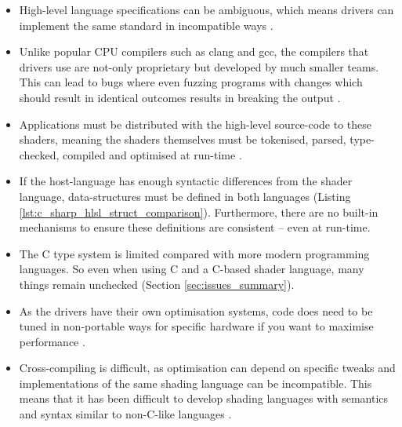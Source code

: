 \documentclass[a4paper,12pt,twoside,openright]{report}
\begin{document}
\begin{itemize}

    \item High-level language specifications can be ambiguous, which means
    drivers can implement the same standard in incompatible ways \cite{TODO}.

    \item Unlike popular CPU compilers such as clang and gcc, the compilers
    that drivers use are not-only proprietary but developed by much smaller
    teams. This can lead to bugs where even fuzzing programs with changes which
    should result in identical outcomes results in breaking the output
    \cite{GLFuzz}. %

    \item Applications must be distributed with the high-level source-code to
    these shaders, meaning the shaders themselves must be tokenised, parsed,
    type-checked, compiled and optimised at run-time \cite{TODO}.

    \item If the host-language has enough syntactic differences from the shader
    language, data-structures must be defined in both languages (Listing
    \ref{lst:c_sharp_hlsl_struct_comparison}). Furthermore, there are no
    built-in mechanisms to ensure these definitions are consistent -- even at
    run-time.

    \item The C type system is limited compared with more modern programming
    languages. So even when using C and a C-based shader language, many things
    remain unchecked (Section \ref{sec:issues_summary}).

    \item As the drivers have their own optimisation systems, code does need to
    be tuned in non-portable ways for specific hardware if you want to maximise
    performance \cite{TODO}.

    \item Cross-compiling is difficult, as optimisation can depend on specific
    tweaks and implementations of the same shading language can be
    incompatible. This means that it has been difficult to develop shading
    languages with semantics and syntax similar to non-C-like languages
    \cite{TODO}.

\end{itemize}
\end{document}

